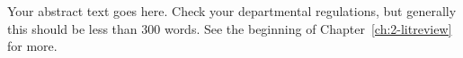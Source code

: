 Your abstract text goes here.  Check your departmental regulations, but generally this should be less than 300 words.  See the beginning of Chapter~\ref{ch:2-litreview} for more.


